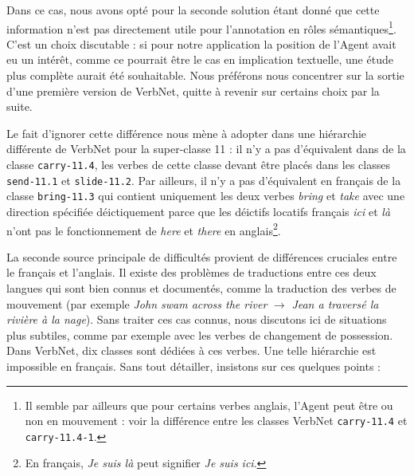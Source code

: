 Dans ce cas, nous avons opté pour la seconde solution étant donné que cette
information n'est pas directement utile pour l'annotation en rôles
sémantiques\footnote{Il semble par ailleurs que pour certains verbes anglais,
    l'Agent peut être ou non en mouvement : voir la différence entre les
classes VerbNet {\color{blue}\texttt{carry-11.4}} et {\color{blue}\texttt{carry-11.4-1}}.}.
C'est un choix discutable : si pour notre application la position de l'Agent
avait eu un intérêt, comme ce pourrait être le cas en implication textuelle,
une étude plus complète aurait été souhaitable. Nous préférons nous concentrer
sur la sortie d'une première version de VerbNet, quitte à revenir sur certains
choix par la suite.

Le fait d'ignorer cette différence nous mène à adopter dans \verbenet{} une
hiérarchie différente de VerbNet pour la super-classe 11 : il n'y a pas
d'équivalent dans \verbenet{} de la classe {\color{blue}\texttt{carry-11.4}}, les verbes
de cette classe devant être placés dans les classes {\color{blue}\texttt{send-11.1}} et
{\color{blue}\texttt{slide-11.2}}. Par ailleurs, il n'y a pas d'équivalent en français
de la classe {\color{blue}\texttt{bring-11.3}} qui contient uniquement les deux verbes
\emph{bring} et \emph{take} avec une direction spécifiée déictiquement
\citep[page 135]{levin1993english} parce que les déictifs locatifs français
\emph{ici} et \emph{là} n'ont pas le fonctionnement de \emph{here} et
\emph{there} en anglais\footnote{En français, \emph{Je suis là} peut signifier
\emph{Je suis ici}.}.

La seconde source principale de difficultés provient de différences cruciales
entre le français et l'anglais. Il existe des problèmes de traductions entre
ces deux langues qui sont bien connus et documentés, comme la traduction des
verbes de mouvement (par exemple \emph{John swam across the river}
$\rightarrow$ \emph{Jean a traversé la rivière à la nage}). Sans traiter ces
cas connus, nous discutons ici de situations plus subtiles, comme par exemple
avec les verbes de changement de possession. Dans VerbNet, dix classes sont
dédiées à ces verbes. Une telle hiérarchie est impossible en français. Sans
tout détailler, insistons sur ces quelques points :

